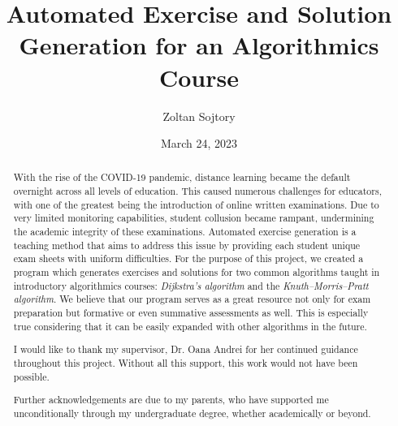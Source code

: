 \documentclass{l4proj}
\begin{document}
\title{Automated Exercise and Solution Generation for an Algorithmics Course}
\author{Zoltan Sojtory}
\date{March 24, 2023}

\maketitle

\begin{abstract}
	With the rise of the COVID-19 pandemic, distance learning became the default overnight across all levels of education. This caused numerous challenges for educators, with one of the greatest being the introduction of online written examinations. Due to very limited monitoring capabilities, student collusion became rampant, undermining the academic integrity of these examinations. Automated exercise generation is a teaching method that aims to address this issue by providing each student unique exam sheets with uniform difficulties. For the purpose of this project, we created a program which generates exercises and solutions for two common algorithms taught in introductory algorithmics courses: \textit{Dijkstra's algorithm} and the \textit{Knuth–Morris–Pratt algorithm}. We believe that our program serves as a great resource not only for exam preparation but formative or even summative assessments as well. This is especially true considering that it can be easily expanded with other algorithms in the future.
\end{abstract}


\renewcommand{\abstractname}{Acknowledgements}
\begin{abstract}
I would like to thank my supervisor, Dr. Oana Andrei for her continued guidance throughout this project. Without all this support, this work would not have been possible.

Further acknowledgements are due to my parents, who have supported me unconditionally through my undergraduate degree, whether academically or beyond.
\end{abstract}

%
%
%
\educationalconsent
\end{document}
